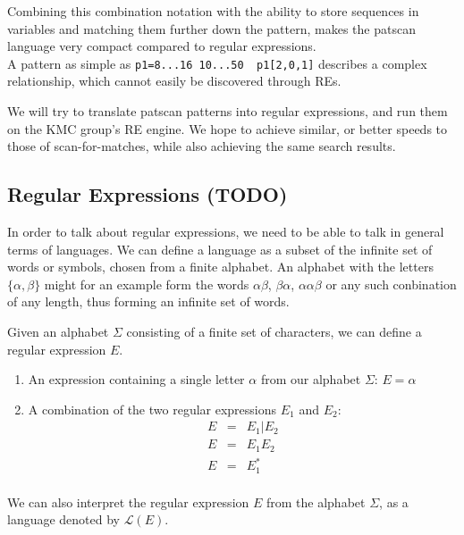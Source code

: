 \documentclass[12pt]{article}
\theoremstyle{definition}
\begin{document}
Combining this combination notation with the ability to store sequences in variables and matching them further down the pattern, makes the patscan language very compact compared to regular expressions. \\
A pattern as simple as \texttt{p1=8...16 10...50 ~p1[2,0,1]} describes a complex relationship, which cannot easily be discovered through REs.

We will try to translate patscan patterns into regular expressions, and run them on the KMC group's RE engine. We hope to achieve similar, or better speeds to those of scan-for-matches, while also achieving the same search results.

\subsection{Regular Expressions (TODO)}

In order to talk about regular expressions, we need to be able to talk in general terms of languages. We can define a language as a subset of the infinite set of words or symbols, chosen from a finite alphabet. An alphabet with the letters $\{\alpha, \beta\}$ might for an example form the words $\alpha\beta$, $\beta\alpha$, $\alpha\alpha\beta$ or any such conbination of any length, thus forming an infinite set of words.\\

\begin{definition} Given an alphabet $\Sigma$ consisting of a finite set of characters, we can define a regular expression $E$.
	\begin{enumerate}
		\item An expression containing a single letter $\alpha$ from our alphabet $\Sigma$: $E = \alpha$
		
		\item A combination of the two regular expressions $E_1$ and $E_2$:
		\begin{eqnarray}
			E &=& E_1 | E_2 \\
			E &=& E_1E_2 \\
			E &=& E_1^* \\
		\end{eqnarray}
	\end{enumerate}	
\end{definition} 

We can also interpret the regular expression $E$ from the alphabet $\Sigma$, as a language denoted by $\mathcal{L}(E)$. \\
\end{document}
